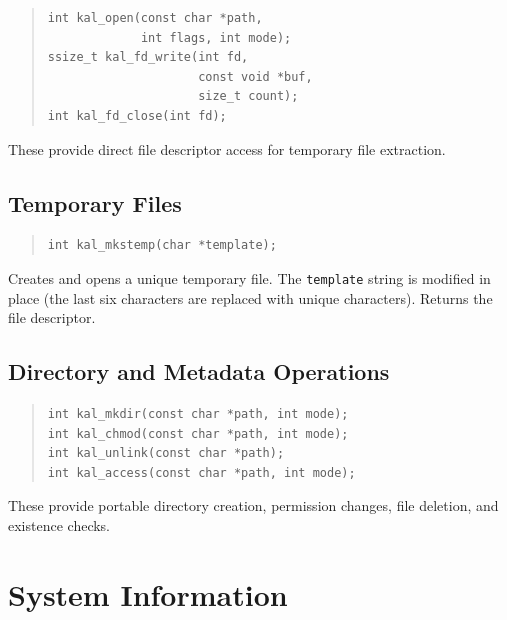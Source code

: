 \documentclass[11pt,twoside]{article}
\begin{document}
\begin{quote}
\begin{verbatim}
int kal_open(const char *path,
             int flags, int mode);
ssize_t kal_fd_write(int fd,
                     const void *buf,
                     size_t count);
int kal_fd_close(int fd);
\end{verbatim}
\end{quote}

These provide direct file descriptor access for temporary file
extraction.

\subsection{Temporary Files}

\begin{quote}
\begin{verbatim}
int kal_mkstemp(char *template);
\end{verbatim}
\end{quote}

Creates and opens a unique temporary file.  The {\tt template}
string is modified in place (the last six characters are replaced
with unique characters).  Returns the file descriptor.

\subsection{Directory and Metadata Operations}

\begin{quote}
\begin{verbatim}
int kal_mkdir(const char *path, int mode);
int kal_chmod(const char *path, int mode);
int kal_unlink(const char *path);
int kal_access(const char *path, int mode);
\end{verbatim}
\end{quote}

These provide portable directory creation, permission changes, file
deletion, and existence checks.

\newpage
\section{System Information}
\label{sec:system}
\end{document}
